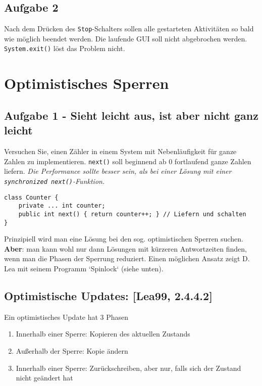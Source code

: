 \subsection{Aufgabe 2}\label{aufgabe-2-1}

Nach dem Drücken des \texttt{Stop}-Schalters sollen alle gestarteten
Aktivitäten so bald wie möglich beendet werden. Die laufende GUI soll
nicht abgebrochen werden. \texttt{System.exit()} löst das Problem nicht.

\section{Optimistisches Sperren}\label{optimistisches-sperren}

\subsection{Aufgabe 1 - Sieht leicht aus, ist aber nicht ganz
leicht}\label{aufgabe-1---sieht-leicht-aus-ist-aber-nicht-ganz-leicht}

Versuchen Sie, einen Zähler in einem System mit Nebenläufigkeit für
ganze Zahlen zu implementieren. \texttt{next()} soll beginnend ab 0
fortlaufend ganze Zahlen liefern. \emph{Die Performance sollte besser
sein, als bei einer Lösung mit einer
\texttt{synchronized\ next()}-Funktion.}

\begin{verbatim}
class Counter {
    private ... int counter;
    public int next() { return counter++; } // Liefern und schalten
}
\end{verbatim}

\begin{important}
Prinzipiell wird man eine Lösung bei den sog. optimistischen Sperren suchen.
\textbf{Aber}: man kann wohl nur dann Lösungen mit kürzeren Antwortzeiten
finden, wenn man die Phasen der Sperrung reduziert. Einen möglichen Ansatz
zeigt D. Lea mit seinem Programm `Spinlock` (siehe unten).
\end{important}

\subsection{Optimistische Updates: {[}Lea99,
2.4.4.2{]}}\label{optimistische-updates-lea99-2.4.4.2}

Ein optimistisches Update hat 3 Phasen

\begin{enumerate}
\def\labelenumi{\arabic{enumi}.}
\tightlist
\item
  Innerhalb einer Sperre: Kopieren des aktuellen Zustands
\item
  Außerhalb der Sperre: Kopie ändern
\item
  Innerhalb einer Sperre: Zurückschreiben, aber nur, falls sich der
  Zustand nicht geändert hat
\end{enumerate}

